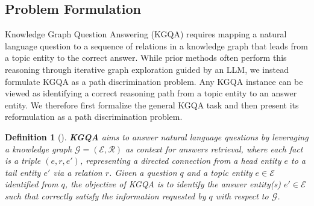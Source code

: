 \documentclass[conference]{IEEEtran}
\newtheorem{definition}{Definition}
\newcommand{\model}{\textsc{APR}}
\begin{document}


\subsection{Problem Formulation}

Knowledge Graph Question Answering (KGQA) requires mapping a natural language question to a sequence of relations in a knowledge graph that leads from a topic entity to the correct answer. While prior methods often perform this reasoning through iterative graph exploration guided by an LLM, we instead formulate KGQA as a path discrimination problem. Any KGQA instance can be viewed as identifying a correct reasoning path from a topic entity to an answer entity. We therefore first formalize the general KGQA task and then present its reformulation as a path discrimination problem.

\begin{definition}[]
\textbf{KGQA} aims to answer natural language questions by leveraging a knowledge graph $\mathcal{G}=(\mathcal{E}, \mathcal{R})$ as context for answers retrieval, where each fact is a triple $(e, r, e')$, representing a directed connection from a head entity $e$ to a tail entity $e'$ via a relation $r$. Given a question $q$ and a topic entity $e \in \mathcal{E}$ identified from $q$, the objective of KGQA is to identify the answer entity(s) $e' \in \mathcal{E}$ such that correctly satisfy the information requested by $q$ with respect to $\mathcal{G}$.
\end{definition}
\end{document}
